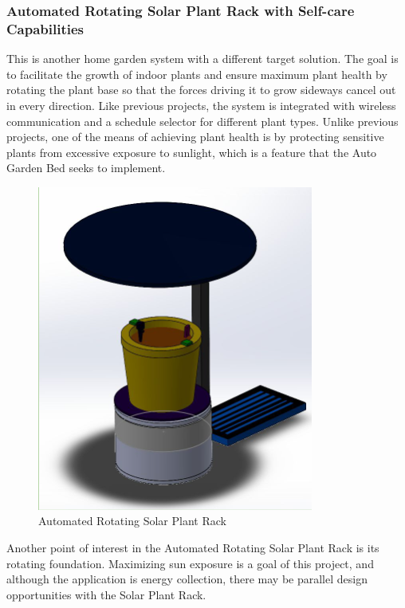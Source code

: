 \subsubsection{Automated Rotating Solar Plant Rack with Self-care Capabilities}

This is another home garden system with a different target solution. The goal is to facilitate the growth of indoor plants and ensure maximum plant health by rotating the plant base so that the forces driving it to grow sideways cancel out in every direction. Like previous projects, the system is integrated with wireless communication and a schedule selector for different plant types. Unlike previous projects, one of the means of achieving plant health is by protecting sensitive plants from excessive exposure to sunlight, which is a feature that the Auto Garden Bed seeks to implement. 

\begin{figure}[H]
    \caption{Automated Rotating Solar Plant Rack}
    \centering
    \includegraphics[width=.5\textwidth]{images/3-1-4Pic.png}
\end{figure}

Another point of interest in the Automated Rotating Solar Plant Rack is its rotating foundation. Maximizing sun exposure is a goal of this project, and although the application is energy collection, there may be parallel design opportunities with the Solar Plant Rack.


